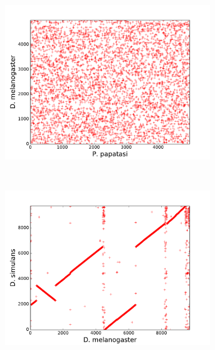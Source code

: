 \begin{figure}[H]
\begin{subfigure}[b]{0.4\textwidth}
    \includegraphics[width=\textwidth]{figures/synteny/papatasi_dmel_plot}
    \caption{\label{fig:synteny-dotplots-papatasi-dmel}}
  \end{subfigure}
  ~
  \begin{subfigure}[b]{0.4\textwidth}
    \includegraphics[width=\textwidth]{figures/synteny/dmel_dsim_plot}
    \caption{\label{fig:synteny-dotplots-drosophila}}
  \end{subfigure}
  ~
  \begin{subfigure}[b]{0.4\textwidth}

\end{subfigure}
\end{figure}
